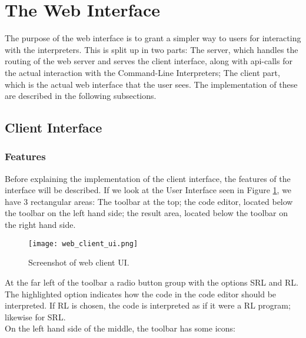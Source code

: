 
\section{The Web Interface}

The purpose of the web interface is to grant a simpler way to users for interacting with the interpreters.
This is split up in two parts:
The server, which handles the routing of the web server and serves the client interface, along with api-calls for the actual interaction with the Command-Line Interpreters;
The client part, which is the actual web interface that the user sees.
The implementation of these are described in the following subsections.

\subsection{Client Interface}


\subsubsection{Features}

\noindent
Before explaining the implementation of the client interface, the features of the interface will be described.
If we look at the User Interface seen in Figure \ref{fig:web_client_ui}, we have 3 rectangular areas: The toolbar at the top; the code editor, located below the toolbar on the left hand side; the result area, located below the toolbar on the right hand side.

\begin{figure}[H]
  \texttt{[image: web\_client\_ui.png]}
  \caption{Screenshot of web client UI.}
  \label{fig:web_client_ui}
\end{figure}

\noindent
At the far left of the toolbar a radio button group with the options SRL and RL. The highlighted option indicates how the code in the code editor should be interpreted. If RL is chosen, the code is interpreted as if it were a RL program; likewise for SRL.\\
On the left hand side of the middle, the toolbar has some icons:\\

